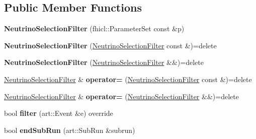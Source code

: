 \subsection*{Public Member Functions}
\begin{DoxyCompactItemize}
\item 
\hypertarget{classNeutrinoSelectionFilter_adb0e654d928530db4d15774bf087f20e}{{\bfseries Neutrino\-Selection\-Filter} (fhicl\-::\-Parameter\-Set const \&p)}\label{classNeutrinoSelectionFilter_adb0e654d928530db4d15774bf087f20e}

\item 
\hypertarget{classNeutrinoSelectionFilter_a63f661621e76ad30756e4ef1b2d54a9d}{{\bfseries Neutrino\-Selection\-Filter} (\hyperlink{classNeutrinoSelectionFilter}{Neutrino\-Selection\-Filter} const \&)=delete}\label{classNeutrinoSelectionFilter_a63f661621e76ad30756e4ef1b2d54a9d}

\item 
\hypertarget{classNeutrinoSelectionFilter_aa32241ed5db76e990a8a36055413c78a}{{\bfseries Neutrino\-Selection\-Filter} (\hyperlink{classNeutrinoSelectionFilter}{Neutrino\-Selection\-Filter} \&\&)=delete}\label{classNeutrinoSelectionFilter_aa32241ed5db76e990a8a36055413c78a}

\item 
\hypertarget{classNeutrinoSelectionFilter_a49e2154a532eaa0f50270299b90c5bce}{\hyperlink{classNeutrinoSelectionFilter}{Neutrino\-Selection\-Filter} \& {\bfseries operator=} (\hyperlink{classNeutrinoSelectionFilter}{Neutrino\-Selection\-Filter} const \&)=delete}\label{classNeutrinoSelectionFilter_a49e2154a532eaa0f50270299b90c5bce}

\item 
\hypertarget{classNeutrinoSelectionFilter_a487b0e18767f6cee88556b38f3ddff3d}{\hyperlink{classNeutrinoSelectionFilter}{Neutrino\-Selection\-Filter} \& {\bfseries operator=} (\hyperlink{classNeutrinoSelectionFilter}{Neutrino\-Selection\-Filter} \&\&)=delete}\label{classNeutrinoSelectionFilter_a487b0e18767f6cee88556b38f3ddff3d}

\item 
\hypertarget{classNeutrinoSelectionFilter_a397e90eb7ce59516d4f7ba2338e40f6c}{bool {\bfseries filter} (art\-::\-Event \&e) override}\label{classNeutrinoSelectionFilter_a397e90eb7ce59516d4f7ba2338e40f6c}

\item 
\hypertarget{classNeutrinoSelectionFilter_a7a8b5679956b4addd5eda2a31e033ca3}{bool {\bfseries end\-Sub\-Run} (art\-::\-Sub\-Run \&subrun)}\label{classNeutrinoSelectionFilter_a7a8b5679956b4addd5eda2a31e033ca3}

\end{DoxyCompactItemize}
